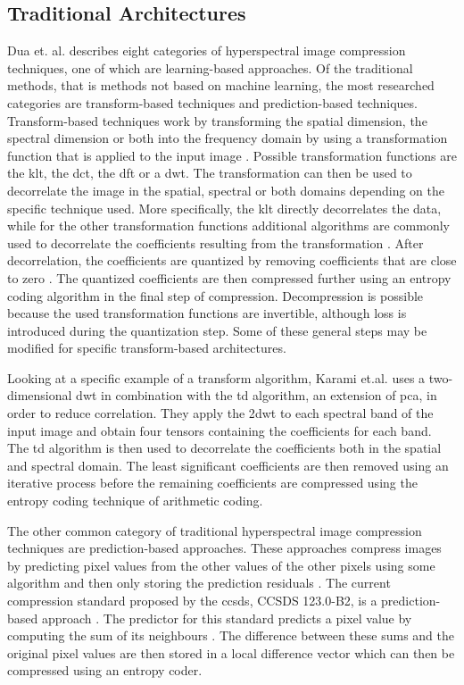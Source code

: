 \subsection{Traditional Architectures}
Dua et. al. \citep{dua_comprehensive_2020} describes eight categories of hyperspectral image compression techniques, one of which are learning-based approaches. Of the traditional methods, that is methods not based on machine learning, the most researched categories are transform-based techniques and prediction-based techniques. Transform-based techniques work by transforming the spatial dimension, the spectral dimension or both into the frequency domain by using a transformation function that is applied to the input image \citep{dua_comprehensive_2020}. Possible transformation functions are the \ac{klt}, the \ac{dct}, the \ac{dft} or a \ac{dwt}. The transformation can then be used to decorrelate the image in the spatial, spectral or both domains depending on the specific technique used. More specifically, the \ac{klt} directly decorrelates the data, while for the other transformation functions additional algorithms are commonly used to decorrelate the coefficients resulting from the transformation \citep{saghri_adaptive_2010,karami_compression_2012}. After decorrelation, the coefficients are quantized by removing coefficients that are close to zero \citep{dua_comprehensive_2020}. The quantized coefficients are then compressed further using an entropy coding algorithm in the final step of compression. Decompression is possible because the used transformation functions are invertible, although loss is introduced during the quantization step. Some of these general steps may be modified for specific transform-based architectures.

Looking at a specific example of a transform algorithm, Karami et.al. \citep{karami_compression_2012} uses a two-dimensional \ac{dwt} in combination with the \ac{td} algorithm, an extension of \ac{pca}, in order to reduce correlation. They apply the 2\ac{dwt} to each spectral band of the input image and obtain four tensors containing the coefficients for each band. The \ac{td} algorithm is then used to decorrelate the coefficients both in the spatial and spectral domain. The least significant coefficients are then removed using an iterative process before the remaining coefficients are compressed using the entropy coding technique of arithmetic coding.

The other common category of traditional hyperspectral image compression techniques are prediction-based approaches. These approaches compress images by predicting pixel values from the other values of the other pixels using some algorithm and then only storing the prediction residuals \citep{dua_comprehensive_2020,conoscenti_constant_2016}. The current compression standard proposed by the \ac{ccsds}, CCSDS 123.0-B2, is a prediction-based approach \citep{hernandez-cabronero_ccsds_2021}. The predictor for this standard predicts a pixel value by computing the sum of its neighbours \citep{conoscenti_constant_2016}. The difference between these sums and the original pixel values are then stored in a local difference vector which can then be compressed using an entropy coder.
